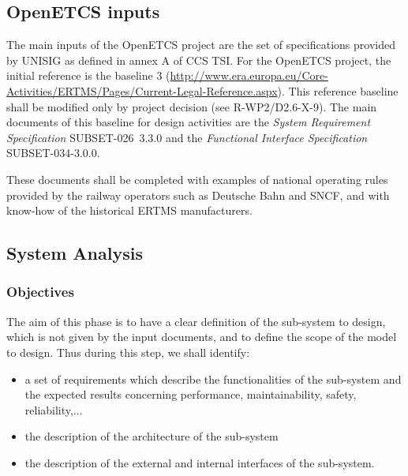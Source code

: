 
\subsection{OpenETCS inputs}
\label{sec:inputs}


The main inputs of the OpenETCS project are the set of specifications provided by UNISIG as defined in annex A of CCS TSI. For the OpenETCS project, the initial reference is the baseline 3 (\url{http://www.era.europa.eu/Core-Activities/ERTMS/Pages/Current-Legal-Reference.aspx}). This reference baseline shall be modified only by project decision (see R-WP2/D2.6-X-9).
The main documents of this baseline for design activities are the \emph{System Requirement Specification} SUBSET-026~3.3.0 and the \textit{Functional Interface Specification} SUBSET-034-3.0.0.

These documents shall be completed with examples of national operating rules
provided by the railway operators such as Deutsche Bahn and SNCF, and with
know-how of the historical ERTMS manufacturers.




\subsection{System Analysis}
\label{sec:sys-analysis}


\subsubsection{Objectives}
\label{sec:sys-ana-objective}

The aim of this phase is to have a clear definition of the sub-system to design, which is not given by the input documents, and to define the scope of the model to design. Thus during this step, we shall identify:

\begin{itemize}
\item a set of requirements which describe the functionalities of the sub-system and the expected results concerning performance, maintainability, safety, reliability,...
\item the description of the architecture of the sub-system
\item the description of the external and internal interfaces of the sub-system.
\end{itemize}

